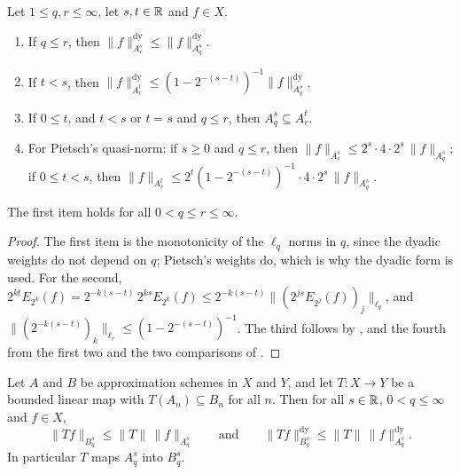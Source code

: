 \begin{theorem}
\label{thm:approx-embedding}
\leanok
{}
Let $1 \leq q, r \leq \infty$, let $s, t \in \mathbb{R}$ and $f \in X$.
\begin{enumerate}
  \item If $q \leq r$, then $\|f\|^{\mathrm{dy}}_{A^s_r} \leq \|f\|^{\mathrm{dy}}_{A^s_q}$.
  \item If $t < s$, then $\|f\|^{\mathrm{dy}}_{A^t_r} \leq (1 - 2^{-(s-t)})^{-1}
    \|f\|^{\mathrm{dy}}_{A^s_q}$.
  \item If $0 \leq t$, and $t < s$ or $t = s$ and $q \leq r$, then $A^s_q \subseteq A^t_r$.
  \item For Pietsch's quasi-norm: if $s \geq 0$ and $q \leq r$, then
    $\|f\|_{A^s_r} \leq 2^s \cdot 4 \cdot 2^s \, \|f\|_{A^s_q}$; if $0 \leq t < s$, then
    $\|f\|_{A^t_r} \leq 2^t (1 - 2^{-(s-t)})^{-1} \cdot 4 \cdot 2^s \, \|f\|_{A^s_q}$.
\end{enumerate}
The first item holds for all $0 < q \leq r \leq \infty$.
\end{theorem}

\begin{proof}
\leanok
The first item is the monotonicity of the $\ell_q$ norms in $q$, since the dyadic weights do
not depend on $q$; Pietsch's weights do, which is why the dyadic form is used. For the
second, $2^{kt} E_{2^k}(f) = 2^{-k(s-t)} \, 2^{ks} E_{2^k}(f) \leq 2^{-k(s-t)}
\|(2^{js} E_{2^j}(f))_j\|_{\ell_q}$, and $\|(2^{-k(s-t)})_k\|_{\ell_r} \leq (1 -
2^{-(s-t)})^{-1}$. The third follows by , and the fourth from the first
two and the two comparisons of .
\end{proof}

\begin{lemma}[Functoriality]
\label{lem:approx-functorial}
\leanok
{}
Let $A$ and $B$ be approximation schemes in $X$ and $Y$, and let $T : X \to Y$ be a bounded
linear map with $T(A_n) \subseteq B_n$ for all $n$. Then for all $s \in \mathbb{R}$,
$0 < q \leq \infty$ and $f \in X$,
\[
  \|Tf\|_{B^s_q} \leq \|T\| \, \|f\|_{A^s_q}
  \qquad \text{and} \qquad
  \|Tf\|^{\mathrm{dy}}_{B^s_q} \leq \|T\| \, \|f\|^{\mathrm{dy}}_{A^s_q} .
\]
In particular $T$ maps $A^s_q$ into $B^s_q$.
\end{lemma}

